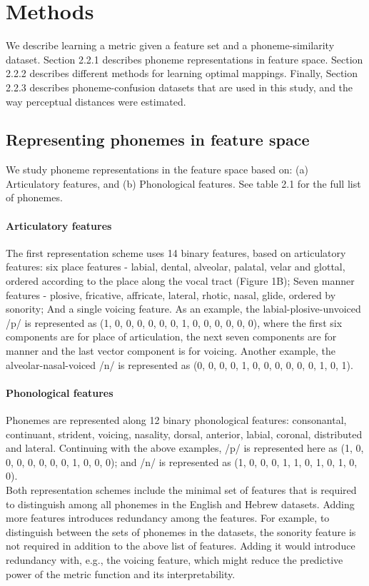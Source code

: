 \section{Methods}
We describe learning a metric given a feature set and a phoneme-similarity dataset. Section 2.2.1 describes phoneme representations in feature space. Section 2.2.2 describes different methods for learning optimal mappings. Finally, Section 2.2.3 describes phoneme-confusion datasets that are used in this study, and the way perceptual distances were estimated.

\subsection{Representing phonemes in feature space}
We study phoneme representations in the feature space based on: (a) Articulatory features, and (b) Phonological features. See table 2.1 for the full list of phonemes.

\paragraph{Articulatory features} The first representation scheme uses 14 binary features, based on articulatory features: six place features - labial, dental, alveolar, palatal, velar and glottal, ordered according to the place along the vocal tract (Figure 1B); Seven manner features - plosive, fricative, affricate, lateral, rhotic, nasal, glide, ordered by sonority; And a single voicing feature. As an example, the labial-plosive-unvoiced /p/ is represented  as (1, 0, 0, 0, 0, 0, 0, 1, 0, 0, 0, 0, 0, 0), where the first six components are for place of articulation, the next seven components are for manner and the last vector component is for voicing. Another example, the alveolar-nasal-voiced /n/ is represented as (0, 0, 0, 0, 1, 0, 0, 0, 0, 0, 0, 1, 0, 1).

\paragraph{Phonological features} Phonemes are represented along 12 binary phonological features: consonantal, continuant, strident, voicing, nasality, dorsal, anterior, labial, coronal, distributed and lateral. Continuing with the above examples, /p/ is represented here as (1, 0, 0, 0, 0, 0, 0, 0, 1, 0, 0, 0); and /n/ is represented as (1, 0, 0, 0, 1, 1, 0, 1, 0, 1, 0, 0). \mbox{} \\

Both representation schemes include the minimal set of features that is required to distinguish among all phonemes in the English and Hebrew datasets. Adding more features introduces redundancy among the features. For example, to distinguish between the sets of phonemes in the datasets, the sonority feature is not required in addition to the above list of features. Adding it would introduce redundancy with, e.g., the voicing feature, which might reduce the predictive power of the metric function and its interpretability.


